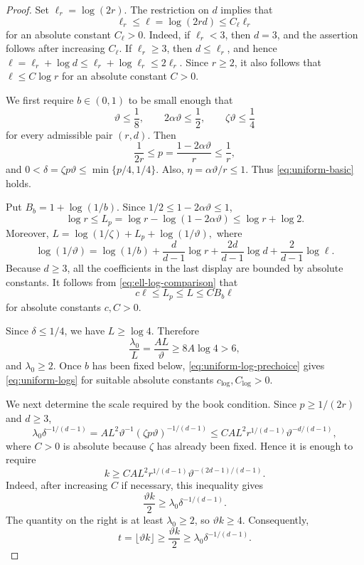 \documentclass[twoside,12pt]{article}
\theoremstyle{definition}
\theoremstyle{remark}
\newcommand{\1}{\mathbf 1}
\begin{document}
\begin{proof}
Set $\ell_r=\log(2r)$. The restriction on $d$ implies that
\begin{equation}\label{eq:ell-log-comparison}
 \ell_r\le\ell=\log(2rd)\le C_{\ell}\ell_r
\end{equation}
for an absolute constant $C_{\ell}>0$. Indeed, if $\ell_r<3$, then $d=3$,
and the assertion follows after increasing $C_{\ell}$. If $\ell_r\ge3$,
then $d\le\ell_r$, and hence
$
 \ell=\ell_r+\log d
 \le\ell_r+\log\ell_r
 \le2\ell_r.
$
Since $r\ge2$, it also follows that $\ell\le C\log r$ for an absolute
constant $C>0$.

We first require $b\in(0,1)$ to be small enough that
\[
 \vartheta\le\frac18,
 \qquad
 2\alpha\vartheta\le\frac12,
 \qquad
 \zeta\vartheta\le\frac14
\]
for every admissible pair $(r,d)$. Then
\[
 \frac1{2r}\le
 p=\frac{1-2\alpha\vartheta}{r}
 \le\frac1r,
\]
and
$
 0<\delta=\zeta p\vartheta
 \le\min\{p/4,1/4\}.
$
Also, $\eta=\alpha\vartheta/r\le1$. Thus
\eqref{eq:uniform-basic} holds.

Put $B_b=1+\log(1/b)$. Since
$1/2\le1-2\alpha\vartheta\le1$,
\[
 \log r\le L_p
 =\log r-\log(1-2\alpha\vartheta)
 \le\log r+\log2.
\]
Moreover,
$L=\log(1/\zeta)+L_p+\log(1/\vartheta),
$
where
\[
 \log(1/\vartheta)
 =\log(1/b)
 +\frac{d}{d-1}\log r
 +\frac{2d}{d-1}\log d
 +\frac{2}{d-1}\log\ell.
\]
Because $d\ge3$, all the coefficients in the last display are bounded by
absolute constants. It follows from \eqref{eq:ell-log-comparison} that
\begin{equation}\label{eq:uniform-log-prechoice}
 c\ell\le L_p\le L\le CB_b\ell
\end{equation}
for absolute constants $c,C>0$.

Since $\delta\le1/4$, we have $L\ge\log4$. Therefore
\[
 \frac{\lambda_0}{L}
 =\frac{AL}{\vartheta}
 \ge8A\log4>6,
\]
and $\lambda_0\ge2$. Once $b$ has been fixed below,
\eqref{eq:uniform-log-prechoice} gives \eqref{eq:uniform-logs} for suitable
absolute constants $c_{\log},C_{\log}>0$.

We next determine the scale required by the book condition. Since
$p\ge1/(2r)$ and $d\ge3$,
\[
 \lambda_0\delta^{-1/(d-1)}
 =AL^2\vartheta^{-1}(\zeta p\vartheta)^{-1/(d-1)}
 \le CA L^2r^{1/(d-1)}\vartheta^{-d/(d-1)},
\]
where $C>0$ is absolute because $\zeta$ has already been fixed. Hence it is
enough to require
\begin{equation}\label{eq:uniform-threshold-reduction}
 k\ge CA L^2r^{1/(d-1)}
 \vartheta^{-(2d-1)/(d-1)}.
\end{equation}
Indeed, after increasing $C$ if necessary, this inequality gives
\[
 \frac{\vartheta k}{2}
 \ge\lambda_0\delta^{-1/(d-1)}.
\]
The quantity on the right is at least $\lambda_0\ge2$, so
$\vartheta k\ge4$. Consequently,
\[
 t=\lfloor\vartheta k\rfloor
 \ge\frac{\vartheta k}{2}
 \ge\lambda_0\delta^{-1/(d-1)}.
\]


\end{proof}
\end{document}
